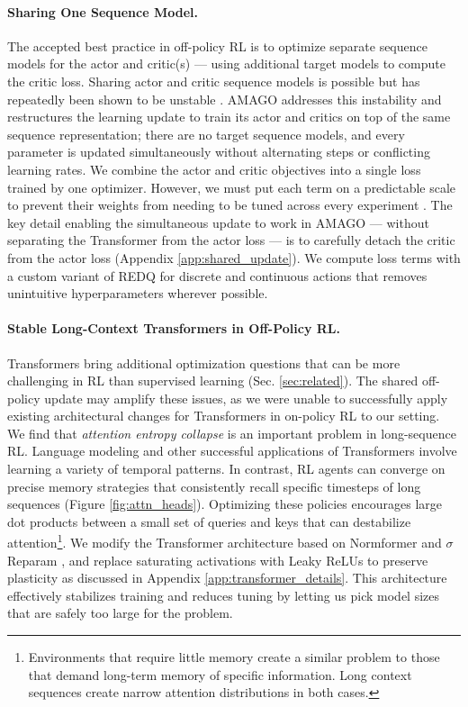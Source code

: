 \paragraph{Sharing One Sequence Model.} The accepted best practice in off-policy RL is to optimize separate sequence models for the actor and critic(s) --- using additional target models to compute the critic loss. Sharing actor and critic sequence models is possible but has repeatedly been shown to be unstable \cite{ni2022recurrent, yang2021recurrent, yarats2021improving}. AMAGO addresses this instability and restructures the learning update to train its actor and critics on top of the same sequence representation; there are no target sequence models, and every parameter is updated simultaneously without alternating steps or conflicting learning rates. We combine the actor and critic objectives into a single loss trained by one optimizer. However, we must put each term on a predictable scale to prevent their weights from needing to be tuned across every experiment \cite{van2016learning, hafner2020mastering}. The key detail enabling the simultaneous update to work in AMAGO --- without separating the Transformer from the actor loss \cite{yarats2021improving, yang2021recurrent} --- is to carefully detach the critic from the actor loss (Appendix \ref{app:shared_update}). We compute loss terms with a custom variant of REDQ \cite{chen2021randomized} for discrete and continuous actions that removes unintuitive hyperparameters wherever possible.

\paragraph{Stable Long-Context Transformers in Off-Policy RL.} Transformers bring additional optimization questions that can be more challenging in RL than supervised learning (Sec. \ref{sec:related}). The shared off-policy update may amplify these issues, as we were unable to successfully apply existing architectural changes for Transformers in on-policy RL \cite{parisotto2020stabilizing, melo2022transformers} to our setting. We find that \textit{attention entropy collapse} \cite{zhai2023stabilizing} is an important problem in long-sequence RL. Language modeling and other successful applications of Transformers involve learning a variety of temporal patterns. In contrast, RL agents can converge on precise memory strategies that consistently recall specific timesteps of long sequences (Figure \ref{fig:attn_heads}). Optimizing these policies encourages large dot products between a small set of queries and keys that can destabilize attention\footnote{Environments that require little memory create a similar problem to those that demand long-term memory of specific information. Long context sequences create narrow attention distributions in both cases.}. We modify the Transformer architecture based on Normformer \cite{shleifer2021normformer} and $\sigma$Reparam \cite{zhai2023stabilizing}, and replace saturating activations with Leaky ReLUs to preserve plasticity \cite{abbas2023loss, li2023efficient} as discussed in Appendix \ref{app:transformer_details}. This architecture effectively stabilizes training and reduces tuning by letting us pick model sizes that are safely too large for the problem.

